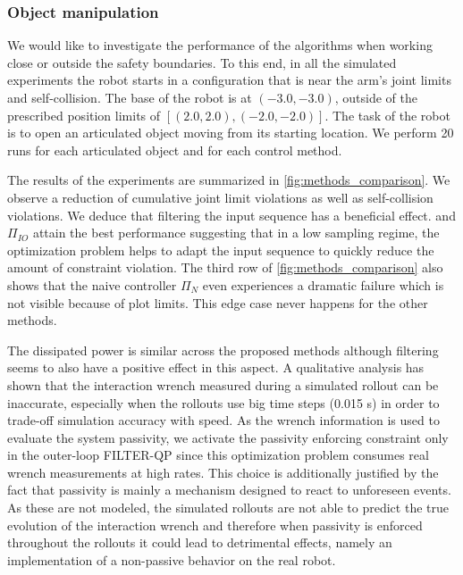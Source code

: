 \vspace{0.3cm}
\subsubsection{Object manipulation}
We would like to investigate the performance of the algorithms when working close or outside the safety boundaries. To this end, in all the simulated experiments the robot starts in a configuration that is near the arm's joint limits and self-collision. The base of the robot is at $(-3.0, -3.0)$, outside of the prescribed position limits of $[(2.0, 2.0), (-2.0, -2.0)]$. The task of the robot is to open an articulated object moving from its starting location. We perform 20 runs for each articulated object and for each control method.

The results of the experiments are summarized in \fig \ref{fig:methods_comparison}. We observe a reduction of cumulative joint limit violations as well as self-collision violations. We deduce that filtering the input sequence has a beneficial effect. \ctrlOuter and $\Pi_{IO}$ attain the best performance suggesting that in a low sampling regime, the optimization problem helps to adapt the input sequence to quickly reduce the amount of constraint violation. The third row of \fig \ref{fig:methods_comparison} also shows that the naive controller $\Pi_{N}$ even experiences a dramatic failure which is not visible because of plot limits. This edge case never happens for the other methods. 

The dissipated power is similar across the proposed methods although filtering seems to also have a positive effect in this aspect. A qualitative analysis has shown that the interaction wrench measured during a simulated rollout can be inaccurate, especially when the rollouts use big time steps (0.015 s) in order to trade-off simulation accuracy with speed. As the wrench information is used to evaluate the system passivity, we activate the passivity enforcing constraint only in the outer-loop FILTER-QP since this optimization problem consumes real wrench measurements at high rates. This choice is additionally justified by the fact that passivity is mainly a mechanism designed to react to unforeseen events. As these are not modeled, the simulated rollouts are not able to predict the true evolution of the interaction wrench and therefore when passivity is enforced throughout the rollouts it could lead to detrimental effects, namely an implementation of a non-passive behavior on the real robot.


